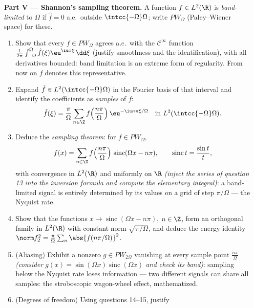 \begin{problem}[{Weekend problem --- $\partial_tu =
\partial^2_{xx}u$, solved end to end}]
\medskip
\noindent\textbf{Part V --- Shannon's sampling theorem.} A
function $f \in L^2(\R)$ is \emph{band-limited} to $\Omega$
if $\hat f = 0$ a.e.\ outside $\intcc{-\Omega}\Omega$; write
$PW_\Omega$ (Paley--Wiener space) for these.
\begin{enumerate}[resume]
  \item Show that every $f \in PW_\Omega$ agrees a.e.\ with
        the $\mathcal C^\infty$ function
        $\frac1{2\pi}\int_{-\Omega}^{\Omega}\hat
        f(\xi)\eu^{\iu x\xi}\,\dd\xi$ (justify smoothness and
        the identification), with all derivatives bounded:
        band limitation is an extreme form of regularity.
        From now on $f$ denotes this representative.
  \item Expand $\hat f \in L^2(\intcc{-\Omega}\Omega)$ in the
        Fourier basis of that interval and identify the
        coefficients as \emph{samples} of $f$:
        \[
        \hat f(\xi) = \frac\pi\Omega\sum_{n\in\Z}
        f\Bigl(\frac{n\pi}\Omega\Bigr)\,
        \eu^{-\iu n\pi\xi/\Omega}
        \quad\text{in } L^2(\intcc{-\Omega}\Omega) .
        \]
  \item Deduce the \emph{sampling theorem}: for $f \in
        PW_\Omega$,
        \[
        f(x) = \sum_{n\in\Z}f\Bigl(\frac{n\pi}
        \Omega\Bigr)\,\operatorname{sinc}(\Omega x - n\pi),
        \qquad \operatorname{sinc}t = \frac{\sin t}t,
        \]
        with convergence in $L^2(\R)$ and uniformly on $\R$
        \emph{(inject the series of question 13 into the
        inversion formula and compute the elementary
        integral)}: a band-limited signal is entirely
        determined by its values on a grid of step
        $\pi/\Omega$ --- the Nyquist rate.
  \item Show that the functions $x \mapsto
        \operatorname{sinc}(\Omega x - n\pi)$, $n \in \Z$,
        form an orthogonal family in $L^2(\R)$ with constant
        norm $\sqrt{\pi/\Omega}$, and deduce the energy
        identity $\norm f_2^2 =
        \frac\pi\Omega\sum_n\abs{f(n\pi/\Omega)}^2$.
  \item (Aliasing) Exhibit a nonzero $g \in PW_{2\Omega}$
        vanishing at every sample point $\frac{n\pi}\Omega$
        \emph{(consider $g(x) =
        \sin(\Omega x)\operatorname{sinc}(\Omega x)$ and
        check its band)}: sampling below the Nyquist rate
        loses information --- two different signals can share
        all samples: the stroboscopic wagon-wheel effect,
        mathematized.
  \item (Degrees of freedom) Using questions 14--15, justify

\end{enumerate}
\end{problem}
